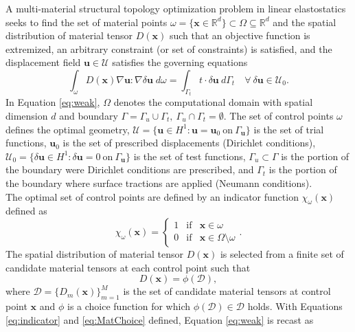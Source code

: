 A multi-material structural topology optimization problem in linear elastostatics seeks to find the set of material points $\omega=\{\bm x \in \mathbb{R}^d\}\subset\Omega\subseteq\mathbb{R}^d$ and the spatial distribution of material tensor $D(\bm x)$ such that an objective function is extremized, an arbitrary constraint (or set of constraints) is satisfied, and the displacement field $\bm u\in\mathcal{U}$ satisfies the governing equations
\begin{equation}
\label{eq:weak}
\int_{\omega}D(\bm x)\nabla\bm u\colon\nabla\delta\bm u\; d\omega=\int_{\Gamma_{t}} t\cdot\delta\bm{u}\ d\Gamma_t\quad\forall\ \delta\bm u\in\mathcal{U}_0.
\end{equation}
In Equation \eqref{eq:weak}, $\Omega$ denotes the computational domain with spatial dimension $d$ and boundary $\Gamma=\Gamma_u\cup\Gamma_t,\ \Gamma_u\cap\Gamma_t=\emptyset$. The set of control points $\omega$ defines the optimal geometry, $\mathcal{U}=\{\bm u\in H^1\colon\bm{u}=\bm{u}_0\ \mbox{on}\ \Gamma_{\bm u}\}$ is the set of trial functions, $\bm u_0$ is the set of prescribed displacements (Dirichlet conditions), $\mathcal{U}_0=\{\delta\bm u\in H^1\colon\delta\bm{u}=0\ \mbox{on}\ \Gamma_{\bm u}\}$ is the set of test functions, $\Gamma_u\subset\Gamma$ is the portion of the boundary were Dirichlet conditions are prescribed, and $\Gamma_t$ is the portion of the boundary where surface tractions are applied (Neumann conditions). \\

The optimal set of control points are defined by an indicator function $\chi_{\omega}(\bm x)$ defined as
\begin{equation}
\label{eq:indicator}
\chi_{\omega}(\bm x)=
\left\{
\begin{array}{rcl}
1&\mbox{if} & \bm{x}\in\omega
\\
0&\mbox{if} & \bm{x}\in\Omega\setminus\omega
\end{array}
\right. .
\end{equation}
The spatial distribution of material tensor $D(\bm x)$ is selected from a finite set of candidate material tensors at each control point such that 
\begin{equation}
\label{eq:MatChoice}
D(\bm x)=\phi(\mathcal{D}),
\end{equation}
where $\mathcal{D}=\{D_m(\bm x)\}_{m=1}^M$ is the set of candidate material tensors at control point $\bm x$ and $\phi$ is a choice function for which $\phi(\mathcal{D})\in\mathcal{D}$ holds. With Equations \eqref{eq:indicator} and \eqref{eq:MatChoice} defined, Equation \eqref{eq:weak} is recast as

